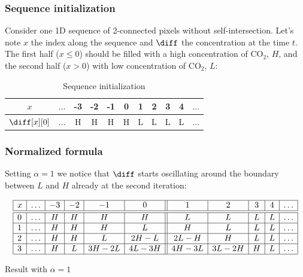 \subsubsection{Sequence initialization}

Consider one 1D sequence of 2-connected pixels without self-intersection.
Let's note $x$ the index along the sequence and $\diff$ the concentration at the 
time $t$. The first half ($x \le 0$) should be filled with a high concentration
of $\mathrm{CO_2}$, $H$, and the second half ($x > 0$) with low concentration 
of $\mathrm{CO_2}$, $L$:

\begin{table}[h]
    \centering
    \begin{tabular}{|c|c|c|c|c|c||c|c|c|c|c|} \hline
        $x$           & $\ldots$ &-3 &-2 &-1 & 0 & 1 & 2 & 3 & 4 & $\ldots$ \\ \hline \hline
        $\diff[x][0]$ & $\ldots$ & H & H & H & H & L & L & L & L & $\ldots$ \\ \hline
    \end{tabular}
    \caption{Sequence initialization}
    \label{tab:init}
\end{table}

\subsubsection{Normalized formula}

Setting $\alpha=1$ we notice that $\diff$ starts oscillating 
around the boundary between $L$ and $H$ already at the second iteration:

\begin{table}[h]
    \centering
    $$
        \begin{array}{|l|c|c|c|c|c||c|c|c|c|c|} \hline
        x&\ldots &-3 &-2 &-1   & 0   & 1    & 2   & 3 & 4 & \ldots \\ \hline \hline
        0&\ldots & H & H & H   & H   & L    & L   & L & L & \ldots \\ \hline
        1&\ldots & H & H & H   & L   & H    & L   & L & L & \ldots \\ \hline
        2&\ldots & H & H & L   &2H-L & 2L-H & H   & L & L & \ldots \\ \hline
        3&\ldots & H & L &3H-2L&4L-3H& 4H-3L&3L-2H& H & L & \ldots \\ \hline 
        \end{array}
    $$
    \caption{Result with $\alpha=1$}
    \label{tab:1D:result_a1}
\end{table}

